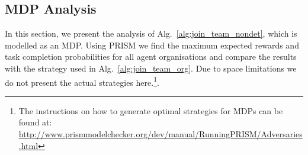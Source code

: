 \documentclass{llncs}
\begin{document}
\subsection{MDP Analysis}
\label{subsec:MDP}
\vspace{-2pt}
In this section, we present the analysis of Alg.~\ref{alg:join_team_nondet}, which is modelled as an MDP. Using PRISM we find the maximum expected rewards and task completion probabilities for all agent organisations and compare the results with the strategy used in Alg.~\ref{alg:join_team_org}. Due to space limitations we do not present the actual strategies here.\footnote{The instructions on how to generate optimal strategies for MDPs can be found at:\\ {\scriptsize\url{http://www.prismmodelchecker.org/dev/manual/RunningPRISM/Adversaries.html}}}.
\end{document}
